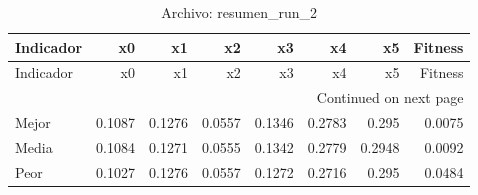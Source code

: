 \begin{longtable}{lrrrrrrr}
\caption{Archivo: resumen\_run\_2}\label{tab:resumen_run_2} \\
\toprule
Indicador & x0 & x1 & x2 & x3 & x4 & x5 & Fitness \\
\midrule
\endfirsthead
\toprule
Indicador & x0 & x1 & x2 & x3 & x4 & x5 & Fitness \\
\midrule
\endhead
\midrule
\multicolumn{8}{r}{Continued on next page} \\
\midrule
\endfoot
\bottomrule
\endlastfoot
Mejor & 0.1087 & 0.1276 & 0.0557 & 0.1346 & 0.2783 & 0.295 & 0.0075 \\
Media & 0.1084 & 0.1271 & 0.0555 & 0.1342 & 0.2779 & 0.2948 & 0.0092 \\
Peor & 0.1027 & 0.1276 & 0.0557 & 0.1272 & 0.2716 & 0.295 & 0.0484 \\
\end{longtable}